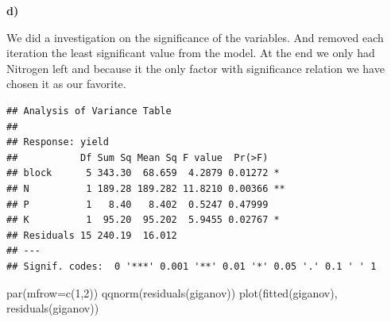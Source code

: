 \documentclass[
]{article}
\newenvironment{Shaded}{\begin{snugshade}}{\end{snugshade}}
\newcommand{\AttributeTok}[1]{\textcolor[rgb]{0.77,0.63,0.00}{#1}}
\newcommand{\DecValTok}[1]{\textcolor[rgb]{0.00,0.00,0.81}{#1}}
\newcommand{\FunctionTok}[1]{\textcolor[rgb]{0.00,0.00,0.00}{#1}}
\newcommand{\NormalTok}[1]{#1}
\newcommand{\OtherTok}[1]{\textcolor[rgb]{0.56,0.35,0.01}{#1}}
\newcommand{\SpecialCharTok}[1]{\textcolor[rgb]{0.00,0.00,0.00}{#1}}
\begin{document}
\textbf{d)}

We did a investigation on the significance of the variables. And removed
each iteration the least significant value from the model. At the end we
only had Nitrogen left and because it the only factor with significance
relation we have chosen it as our favorite.

\begin{Shaded}
\end{Shaded}

\begin{verbatim}
## Analysis of Variance Table
## 
## Response: yield
##           Df Sum Sq Mean Sq F value  Pr(>F)   
## block      5 343.30  68.659  4.2879 0.01272 * 
## N          1 189.28 189.282 11.8210 0.00366 **
## P          1   8.40   8.402  0.5247 0.47999   
## K          1  95.20  95.202  5.9455 0.02767 * 
## Residuals 15 240.19  16.012                   
## ---
## Signif. codes:  0 '***' 0.001 '**' 0.01 '*' 0.05 '.' 0.1 ' ' 1
\end{verbatim}

\begin{Shaded}
\begin{Highlighting}[]
\FunctionTok{par}\NormalTok{(}\AttributeTok{mfrow=}\FunctionTok{c}\NormalTok{(}\DecValTok{1}\NormalTok{,}\DecValTok{2}\NormalTok{))}
\FunctionTok{qqnorm}\NormalTok{(}\FunctionTok{residuals}\NormalTok{(giganov))}
\FunctionTok{plot}\NormalTok{(}\FunctionTok{fitted}\NormalTok{(giganov), }\FunctionTok{residuals}\NormalTok{(giganov))}
\end{Highlighting}
\end{Shaded}
\end{document}
